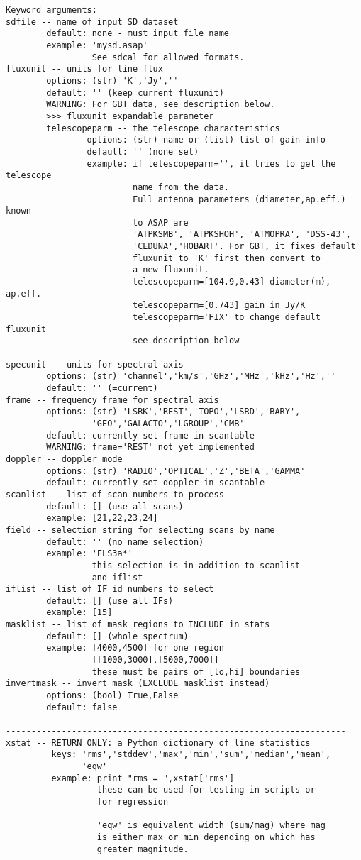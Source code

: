 \begin{verbatim}
Keyword arguments:
sdfile -- name of input SD dataset
        default: none - must input file name
        example: 'mysd.asap'
                 See sdcal for allowed formats.
fluxunit -- units for line flux
        options: (str) 'K','Jy',''
        default: '' (keep current fluxunit)
        WARNING: For GBT data, see description below.
        >>> fluxunit expandable parameter
        telescopeparm -- the telescope characteristics
                options: (str) name or (list) list of gain info
                default: '' (none set)
                example: if telescopeparm='', it tries to get the telescope
                         name from the data.
                         Full antenna parameters (diameter,ap.eff.) known
                         to ASAP are
                         'ATPKSMB', 'ATPKSHOH', 'ATMOPRA', 'DSS-43',
                         'CEDUNA','HOBART'. For GBT, it fixes default 
                         fluxunit to 'K' first then convert to 
                         a new fluxunit.
                         telescopeparm=[104.9,0.43] diameter(m), ap.eff.
                         telescopeparm=[0.743] gain in Jy/K
                         telescopeparm='FIX' to change default fluxunit
                         see description below

specunit -- units for spectral axis
        options: (str) 'channel','km/s','GHz','MHz','kHz','Hz',''
        default: '' (=current)
frame -- frequency frame for spectral axis
        options: (str) 'LSRK','REST','TOPO','LSRD','BARY',
                 'GEO','GALACTO','LGROUP','CMB'
        default: currently set frame in scantable
        WARNING: frame='REST' not yet implemented
doppler -- doppler mode
        options: (str) 'RADIO','OPTICAL','Z','BETA','GAMMA'
        default: currently set doppler in scantable
scanlist -- list of scan numbers to process
        default: [] (use all scans)
        example: [21,22,23,24]
field -- selection string for selecting scans by name
        default: '' (no name selection)
        example: 'FLS3a*'
                 this selection is in addition to scanlist
                 and iflist
iflist -- list of IF id numbers to select
        default: [] (use all IFs)
        example: [15]
masklist -- list of mask regions to INCLUDE in stats
        default: [] (whole spectrum)
        example: [4000,4500] for one region
                 [[1000,3000],[5000,7000]]
                 these must be pairs of [lo,hi] boundaries
invertmask -- invert mask (EXCLUDE masklist instead)
        options: (bool) True,False
        default: false

-------------------------------------------------------------------
xstat -- RETURN ONLY: a Python dictionary of line statistics
         keys: 'rms','stddev','max','min','sum','median','mean',
               'eqw'
         example: print "rms = ",xstat['rms']
                  these can be used for testing in scripts or
                  for regression

                  'eqw' is equivalent width (sum/mag) where mag
                  is either max or min depending on which has
                  greater magnitude.

\end{verbatim}
